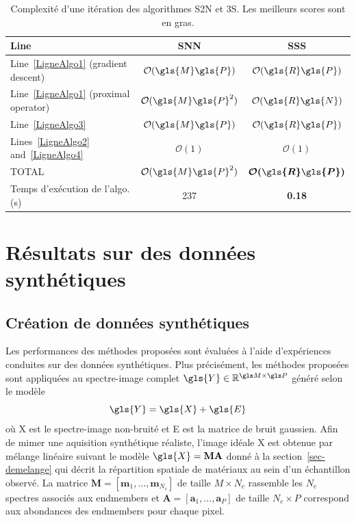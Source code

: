 \begin{table}[h!]
    \centering
    \bgroup
    \def\arraystretch{1.5}
    \begin{tabular}{b{5cm}cc}
        \toprule
        Line&SNN&SSS\\
        \midrule
        Line~\ref{LigneAlgo1} (gradient descent)        &$\mathcal{O}(\gls{M}\gls{P})$      &$\mathcal{O}(\gls{R} \gls{P})$\\
        Line~\ref{LigneAlgo1} (proximal operator)       &$\mathcal{O}(\gls{M}\gls{P}^2)$    &$\mathcal{O}(\gls{R} \gls{N})$\\
        Line~\ref{LigneAlgo3}                           &$\mathcal{O}(\gls{M}\gls{P})$      &$\mathcal{O}(\gls{R}\gls{P})$\\
        Lines~\ref{LigneAlgo2} and~\ref{LigneAlgo4}     &$\mathcal{O}(1)$           &$\mathcal{O}(1)$\\
        TOTAL&$\mathcal{O}(\gls{M}\gls{P}^2)$    &$\boldsymbol{\mathcal{O}(\gls{R} \gls{P})}$\\
        \bottomrule
        Temps d'exécution de l'algo. (s)&237&\textbf{0.18}\\
        \bottomrule
    \end{tabular}
    \egroup
    \caption{Complexité d'une itération des algorithmes S2N et 3S. Les meilleurs scores sont en gras.
        \protect\label{table-ComplexitySummary}}
\end{table} 

%
\section{Résultats sur des données synthétiques}

\subsection{Création de données synthétiques}\label{sec-synth-data-lr}

Les performances des méthodes proposées sont évaluées à l'aide d'expériences conduites sur des données synthétiques. Plus précisément, les méthodes proposées sont appliquées au spectre-image complet $\gls{Y}\in\mathbb{R}^{\taille{M}{P}}$ généré selon le modèle
\begin{equation}
    \gls{Y} = \gls{X} + \gls{E}
\end{equation}
où \gls{X} est le spectre-image non-bruité et \gls{E} est la matrice de bruit gaussien.
Afin de mimer une aquisition synthétique réaliste, l'image idéale \gls{X} est obtenue par mélange linéaire suivant le modèle $\gls{X} = \mathbf{M}\mathbf{A}$ donné à la section~\ref{sec-demelange} qui décrit la répartition spatiale de matériaux au sein d'un échantillon observé. La matrice $\mathbf{M}=[\mathbf{m}_1, \dots, \mathbf{m}_{N_c}]$ de taille $M\times N_c$ rassemble les $N_c$ spectres associés aux endmembers et $\mathbf{A} = [\mathbf{a}_1, \dots, \mathbf{a}_P]$ de taille $N_c\times P$ correspond aux abondances des endmembers pour chaque pixel.

